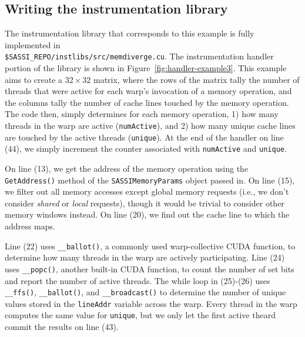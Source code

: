 \subsection{Writing the instrumentation library}

The instrumentation library that corresponds to this example is fully
implemented in \\ \texttt{\$SASSI\_REPO/instlibs/src/memdiverge.cu}.
The instrumentation handler portion of the library is shown in
Figure~\ref{fig:handler-example3}.  This example aims to create a
$32\times32$ matrix, where the rows of the matrix tally the number of
threads that were active for each warp's invocation of a memory
operation, and the columns tally the number of cache lines touched by
the memory operation.  The code then, simply determines for each
memory operation, 1) how many threads in the warp are active
(\texttt{numActive}), and 2) how many unique cache lines are touched
by the active threads (\texttt{unique}).  At the end of the handler on
line (44), we simply increment the counter associated with
\texttt{numActive} and \texttt{unique}.  

On line (13), we get the address of the memory operation using the
\texttt{GetAddress()} method of the \texttt{SASSIMemoryParams} object
passed in.  On line (15), we filter out all memory accesses except
global memory requests (i.e., we don't consider \emph{shared} or
\emph{local} requests), though it would be trivial to consider other
memory windows instead.  On line (20), we find out the cache line to
which the address maps. 

Line (22) uses \texttt{\_\_ballot()}, a commonly used warp-collective
CUDA function, to determine how many threads in the warp are actively
participating.  Line (24) uses \texttt{\_\_popc()}, another built-in
CUDA function, to count the number of set bits and report the number
of active threads.  The while loop in (25)-(26) uses
\texttt{\_\_ffs()}, \texttt{\_\_ballot()}, and \texttt{\_\_broadcast()}
to determine the number of unique values stored in the
\texttt{lineAddr} variable across the warp.  Every thread in the warp
computes the same value for \texttt{unique}, but we only let the first
active theard commit the results on line (43).

